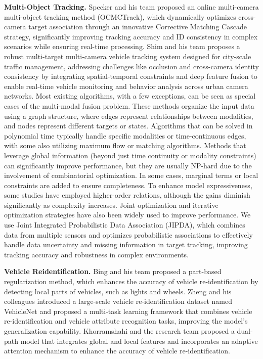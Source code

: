 \documentclass[lettersize,journal]{IEEEtran}
\begin{document}
\textbf{Multi-Object Tracking.}
Specker and his team proposed an online multi-camera multi-object tracking method (OCMCTrack), which dynamically optimizes cross-camera target association through an innovative Corrective Matching Cascade strategy, significantly improving tracking accuracy and ID consistency in complex scenarios while ensuring real-time processing\cite{Alpher24e}.
Shim and his team proposes a robust multi-target multi-camera vehicle tracking system designed for city-scale traffic management, addressing challenges like occlusion and cross-camera identity consistency by integrating spatial-temporal constraints and deep feature fusion to enable real-time vehicle monitoring and behavior analysis across urban camera networks\cite{Alpher21e}.
Most existing algorithms, with a few exceptions, can be seen as special cases of the multi-modal fusion problem. 
These methods organize the input data using a graph structure, where edges represent relationships between modalities, and nodes represent different targets or states. 
Algorithms that can be solved in polynomial time typically handle specific modalities or time-continuous edges, with some also utilizing maximum flow or matching algorithms. 
Methods that leverage global information (beyond just time continuity or modality constraints) can significantly improve performance, but they are usually NP-hard due to the involvement of combinatorial optimization. 
In some cases, marginal terms or local constraints are added to ensure completeness. 
To enhance model expressiveness, some studies have employed higher-order relations, although the gains diminish significantly as complexity increases. 
Joint optimization and iterative optimization strategies have also been widely used to improve performance.
We use Joint Integrated Probabilistic Data Association (JIPDA), which combines data from multiple sensors and optimizes probabilistic associations to effectively handle data uncertainty and missing information in target tracking, improving tracking accuracy and robustness in complex environments.


\textbf{Vehicle Reidentification.}
Bing and his team proposed a part-based regularization method, which enhances the accuracy of vehicle re-identification by detecting local parts of vehicles, such as lights and wheels\cite{Alpher19b}. 
Zheng and his colleagues introduced a large-scale vehicle re-identification dataset named VehicleNet and proposed a multi-task learning framework that combines vehicle re-identification and vehicle attribute recognition tasks, improving the model's generalization capability\cite{Alpher20f}. 
Khorramshahi and the research team proposed a dual-path model that integrates global and local features and incorporates an adaptive attention mechanism to enhance the accuracy of vehicle re-identification\cite{Alpher19c}.
\end{document}
